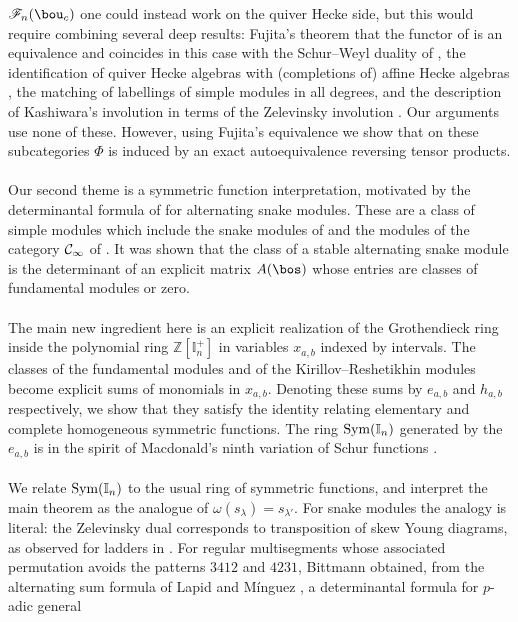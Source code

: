 \documentclass[11pt,reqno]{amsart}
\theoremstyle{definition} \newtheorem*{defn}{Definition}
\theoremstyle{definition}
\numberwithin{equation}{section}
\begin{document}
$\mathscr F_n(\bou_c)$ one could instead work on the quiver Hecke side, but this would require combining several deep results:
Fujita's theorem that the functor of \cite{KKK15} is an equivalence and coincides in this case with the Schur--Weyl duality of
\cite{CP96} \cite{Fuj}, the identification of quiver Hecke algebras with (completions of) affine Hecke algebras
\cite{BK09,Rou08}, the matching of labellings of simple modules in all degrees, and the description of Kashiwara's involution in
terms of the Zelevinsky involution \cite{LTV99,JL10}. Our arguments use none of these. However, using Fujita's equivalence we show that on these subcategories $\Phi$
is induced by an exact autoequivalence reversing tensor products.
\\\\
Our second theme is a symmetric function interpretation, motivated by the determinantal formula of \cite{BC25a} for
alternating snake modules. These are a class of simple modules which include the snake modules of \cite{MY12} and the modules of the
category $\cal C_1$ of \cite{HL10}. It was shown that the class of a stable alternating snake module is the determinant of an explicit matrix $A(\bos)$
whose entries are classes of fundamental modules or zero. \\\\
The main new ingredient here is an explicit realization of the
Grothendieck ring inside the polynomial ring $\mathbb Z[\mathbb I_n^+]$ in variables $x_{a,b}$ indexed by intervals. The classes of the
fundamental modules and of the Kirillov--Reshetikhin modules become explicit sums of monomials in $x_{a,b}$. Denoting these sums by $e_{a,b}$ and $h_{a,b}$ respectively, we show that they satisfy the identity relating elementary and complete
homogeneous symmetric functions. The ring ${\rm Sym}(\mathbb I_n)$ generated by the $e_{a,b}$ is in the spirit of Macdonald's ninth variation of
Schur functions \cite{Mac92}.\\\\
We relate ${\rm Sym}(\mathbb I_n)$ to the usual ring of symmetric functions, and interpret the main theorem as the analogue
of $\omega(s_\lambda)=s_{\lambda'}$. For snake modules the analogy is literal: the Zelevinsky dual corresponds to transposition of skew
Young diagrams, as observed for ladders in \cite{LM14}.
For regular multisegments whose associated permutation avoids the patterns $3412$ and $4231$, Bittmann \cite{Bit23}
obtained, from the alternating sum formula of Lapid and M\'inguez \cite{LM18}, a determinantal formula for $p$-adic general
\end{document}
